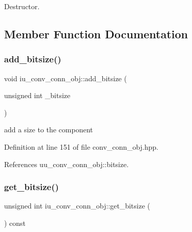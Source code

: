 Destructor. 



\subsection{Member Function Documentation}
\mbox{\label{classiu__conv__conn__obj_a002f631510ac7c0dbb6950ce5af7bf96}} 
\subsubsection{\texorpdfstring{add\+\_\+bitsize()}{add\_bitsize()}}
{\footnotesize\ttfamily void iu\+\_\+conv\+\_\+conn\+\_\+obj\+::add\+\_\+bitsize (\begin{DoxyParamCaption}\item[{unsigned int}]{\+\_\+bitsize }\end{DoxyParamCaption})\hspace{0.3cm}{\ttfamily [inline]}}



add a size to the component 



Definition at line 151 of file conv\+\_\+conn\+\_\+obj.\+hpp.



References uu\+\_\+conv\+\_\+conn\+\_\+obj\+::bitsize.

\mbox{\label{classiu__conv__conn__obj_a62a6e27dd2ce0b9e085b10a4bc76de4a}} 
\subsubsection{\texorpdfstring{get\+\_\+bitsize()}{get\_bitsize()}}
{\footnotesize\ttfamily unsigned int iu\+\_\+conv\+\_\+conn\+\_\+obj\+::get\+\_\+bitsize (\begin{DoxyParamCaption}{ }\end{DoxyParamCaption}) const\hspace{0.3cm}{\ttfamily [inline]}}



